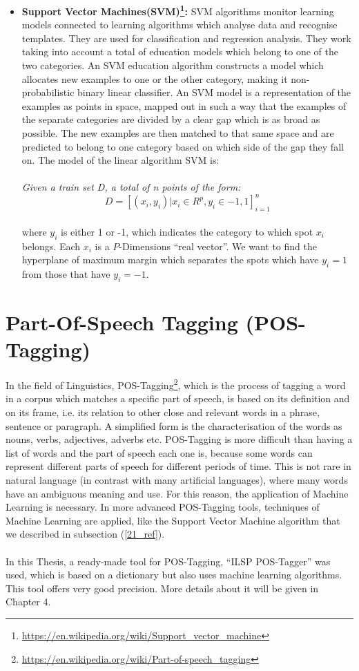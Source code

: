 \begin{itemize}
	\item \textbf{Support Vector Machines(SVM)\footnote{\url{https://en.wikipedia.org/wiki/Support_vector_machine}}:} SVM algorithms monitor learning models connected to learning algorithms which analyse data and recognise templates. They are used for classification and regression analysis. They work taking into account a total of education models which belong to one of the two categories. An SVM education algorithm constructs a model which allocates new examples to one or the other category, making it non-probabilistic binary linear classifier. An SVM model is a representation of the examples as points in space, mapped out in such a way that the examples of the separate categories are divided by a clear gap which is as broad as possible. The new examples are then matched to that same space and are predicted to belong to one category based on which side of the gap they fall on. The model of the linear algorithm  SVM is:\\
\\
\textit{Given a train set D, a total of n points of the form:}
\\
\begin{equation}
D=\left[(x_{i},y_{i})|x_{i}\in R^{p},y_{i}\in{-1,1}\right]_{i=1}^{n}
\end{equation}
\\
where $y_{i}$ is either 1 or -1, which indicates the category to which spot $x_{i}$ belongs. Each $x_{i}$ is a $P$-Dimensions ``real vector''. We want to find the hyperplane of maximum margin which separates the spots which have $y_{i}=1$ from those that have $y_{i}=-1$.

\end{itemize}
\section{Part-Of-Speech Tagging (POS-Tagging)}\label{22_ref}
In the field of Linguistics, POS-Tagging\footnote{\url{https://en.wikipedia.org/wiki/Part-of-speech_tagging}}, which is the process of tagging a word in a corpus which matches a specific part of speech, is based  on its definition and on its frame, i.e. its relation to other close and relevant words in a phrase, sentence or paragraph. A simplified form is the characterisation of the words as nouns, verbs, adjectives, adverbs etc. POS-Tagging is more difficult than having a list of words and the part of speech each one is, because some words can represent different parts of speech for different periods of time. This is not rare in natural language (in contrast with many artificial languages), where many words have an ambiguous meaning and use. For this reason, the application of Machine Learning is necessary. In more advanced POS-Tagging tools, techniques of Machine Learning are applied, like the Support Vector Machine algorithm that we described in subsection (\ref{21_ref}).\\
\\
In this Thesis, a ready-made tool for POS-Tagging, ``ILSP POS-Tagger'' was used, which is based on a dictionary but also uses machine learning algorithms. This tool offers very good precision. More details about it will be given in Chapter 4.

